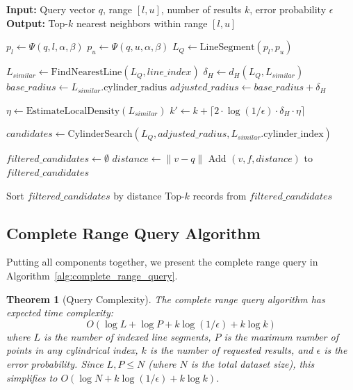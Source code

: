 \documentclass[numbers,sort]{article}
\newtheorem{theorem}{Theorem}
\begin{document}
\begin{algorithm}[h]
\caption{Complete Range Query Processing}
\label{alg:complete_range_query}
\begin{algorithmic}[1]
\STATE \textbf{Input:} Query vector $q$, range $[l, u]$, number of results $k$, error probability $\epsilon$
\STATE \textbf{Output:} Top-$k$ nearest neighbors within range $[l, u]$

\STATE {}
\STATE $p_l \leftarrow \Psi(q, l, \alpha, \beta)$
\STATE $p_u \leftarrow \Psi(q, u, \alpha, \beta)$
\STATE $L_Q \leftarrow \text{LineSegment}(p_l, p_u)$

\STATE {}
\STATE $L_{similar} \leftarrow \text{FindNearestLine}(L_Q, line\_index)$
\STATE $\delta_H \leftarrow d_H(L_Q, L_{similar})$
\STATE $base\_radius \leftarrow L_{similar}.\text{cylinder\_radius}$
\STATE $adjusted\_radius \leftarrow base\_radius + \delta_H$

\STATE {}
\STATE $\eta \leftarrow \text{EstimateLocalDensity}(L_{similar})$
\STATE $k' \leftarrow k + \lceil 2 \cdot \log(1/\epsilon) \cdot \delta_H \cdot \eta \rceil$

\STATE {}
\STATE $candidates \leftarrow \text{CylinderSearch}(L_Q, adjusted\_radius, L_{similar}.\text{cylinder\_index})$

\STATE {}
\STATE $filtered\_candidates \leftarrow \emptyset$
        \STATE $distance \leftarrow \|v - q\|$
        \STATE Add $(v, f, distance)$ to $filtered\_candidates$
    \ENDIF
\ENDFOR

\STATE Sort $filtered\_candidates$ by distance
\RETURN Top-$k$ records from $filtered\_candidates$
\end{algorithmic}
\end{algorithm}

\subsection{Complete Range Query Algorithm}

Putting all components together, we present the complete range query in Algorithm~\ref{alg:complete_range_query}.

\begin{theorem}[Query Complexity]
\label{thm:query-complexity}
The complete range query algorithm has expected time complexity:
\begin{equation}
O(\log L + \log P + k\log(1/\epsilon) + k\log k)
\end{equation}
where $L$ is the number of indexed line segments, $P$ is the maximum number of points in any cylindrical index, $k$ is the number of requested results, and $\epsilon$ is the error probability. Since $L, P \leq N$ (where $N$ is the total dataset size), this simplifies to $O(\log N + k\log(1/\epsilon) + k\log k)$.
\end{theorem}
\end{document}

